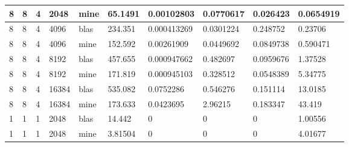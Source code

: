 \documentclass{article}
\begin{document}
\begin{table}[]
{\begin{tabular}{|l|l|l|l|l|l|l|l|l|l|}
8       & 8         & 4     & 2048  & mine & 65.1491 & 0.00102803  & 0.0770617  & 0.026423    & 0.0654919 \\ \hline
8       & 8         & 4     & 4096  & blas & 234.351 & 0.000413269 & 0.0301224  & 0.248752    & 0.23706   \\ \hline
8       & 8         & 4     & 4096  & mine & 152.592 & 0.00261909  & 0.0449692  & 0.0849738   & 0.590471  \\ \hline
8       & 8         & 4     & 8192  & blas & 457.655 & 0.000947662 & 0.482697   & 0.0959676   & 1.37528   \\ \hline
8       & 8         & 4     & 8192  & mine & 171.819 & 0.000945103 & 0.328512   & 0.0548389   & 5.34775   \\ \hline
8       & 8         & 4     & 16384 & blas & 535.082 & 0.0752286   & 0.546276   & 0.151114    & 13.0185   \\ \hline
8       & 8         & 4     & 16384 & mine & 173.633 & 0.0423695   & 2.96215    & 0.183347    & 43.419    \\ \hline
1       & 1         & 1     & 2048 & blas & 14.442 & 0 & 0 & 0 & 1.00556  \\ \hline
1       & 1         & 1     & 2048 & mine & 3.81504 & 0 & 0 & 0 & 4.01677 \\ \hline
\end{tabular}%
}
\end{table}
\end{document}
